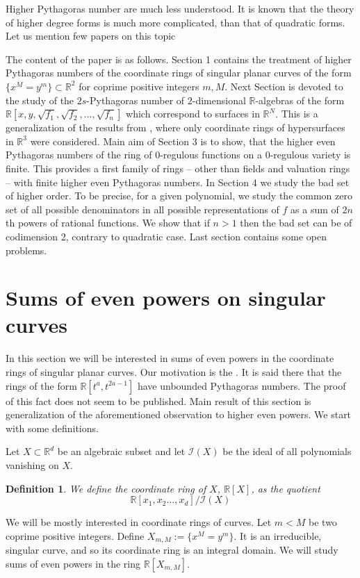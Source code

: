 \documentclass[12pt,reqno]{amsart}   	%
\newtheorem{df}[thm]{Definition}
\theoremstyle{remark}
\newcommand{\R}{\mathbb{R}}
\begin{document}
Higher Pythagoras number are much less understood. It is known that the theory of higher degree forms is much more complicated, than that of quadratic forms. Let us mention few papers on this topic  \cite{bk2023, becker1982, bp1996, grimm2015, km2024, kv2023}



The content of the paper is as follows. Section 1 contains the treatment of higher Pythagoras numbers of the coordinate rings of singular planar curves of the form $\{x^M=y^m \} \subset \R^2$ for coprime positive integers $m,M$. Next Section is devoted to the study of the $2s$-Pythagoras number of $2$-dimensional $\R$-algebras of the form $\R[x,y,\sqrt{f_1},\sqrt{f_2},\dots, \sqrt{f_n}]$ which correspond to surfaces in $\R^N$. This is a generalization of the results from \cite{bk2024}, where only coordinate rings of hypersurfaces in $\R^3$ were considered. Main aim of Section 3 is to show, that the higher even Pythagoras numbers of the ring of $0$-regulous functions on a $0$-regulous variety is finite. This provides a first family of rings -- other than fields and valuation rings -- with finite higher even Pythagoras numbers. In Section 4 we study the bad set of higher order. To be precise, for a given polynomial, we study the common zero set of all possible denominators in all possible representations of $f$ as a sum of $2n$th powers of rational functions. We show that if $n>1$ then the bad set can be of codimension 2, contrary to quadratic case. Last section contains some open problems.


\section{Sums of even powers on singular curves}

In this section we will be interested in sums of even powers in the coordinate rings of singular planar curves. Our motivation is the \cite[Note added in proof]{cldr1982}. It is said there that the rings of the form $\R[t^a,t^{2a-1}]$ have unbounded Pythagoras numbers. The proof of this fact does not seem to be published. Main result of this section is generalization of the aforementioned observation to higher even powers. We start with some definitions.

Let $X\subset \R^d$ be an algebraic subset and let $\mathcal{I}(X)$ be the ideal of all polynomials vanishing on $X$.
\begin{df}
    We define the coordinate ring of $X$, $\R[X]$, as the quotient
    $$ \R[x_1,x_2\dots, x_d] / \mathcal{I}(X)$$
\end{df}
We will be mostly interested in coordinate rings of curves. Let $m<M$ be two coprime positive integers. Define $X_{m,M}:=\{x^M=y^m \}$. It is an irreducible, singular curve, and so its coordinate ring is an  integral domain. We will study sums of even powers in the ring $\R[X_{m,M}]$.
\end{document}

